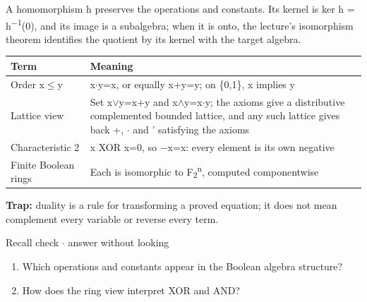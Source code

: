 \documentclass[11pt]{article}
\begin{document}
\begin{keepsection}
\begin{keepsection}
A homomorphism h preserves the operations and constants. Its kernel is ker h = h\textsuperscript{\ensuremath{-}1}(0), and its image is a subalgebra; when it is onto, the lecture’s isomorphism theorem identifies the quotient by its kernel with the target algebra.

\begin{center}\small\begin{tabularx}{\linewidth}{>{\raggedright\arraybackslash}X>{\raggedright\arraybackslash}X}\toprule
\textbf{Term} & \textbf{Meaning} \\ \midrule
Order x\ensuremath{\leq}y & x\ensuremath{\cdot}y=x, or equally x+y=y; on \{0,1\}, x implies y \\
Lattice view & Set x\ensuremath{\lor}y=x+y and x\ensuremath{\land}y=x\ensuremath{\cdot}y; the axioms give a distributive complemented bounded lattice, and any such lattice gives back +, \ensuremath{\cdot} and ' satisfying the axioms \\
Characteristic 2 & x XOR x=0, so \ensuremath{-}x=x: every element is its own negative \\
Finite Boolean rings & Each is isomorphic to F\textsubscript{2}\textsuperscript{n}, computed componentwise \\
\bottomrule\end{tabularx}\end{center}

\begin{notebox}\textbf{Trap:} duality is a rule for transforming a proved equation; it does not mean complement every variable or reverse every term.\end{notebox}

\begin{recallbox}{Recall check \ensuremath{\cdot} answer without looking}
\begin{enumerate}
\item Which operations and constants appear in the Boolean algebra structure?
\item How does the ring view interpret XOR and AND?
\end{enumerate}

\end{recallbox}
\end{keepsection}
\end{keepsection}
\end{document}
